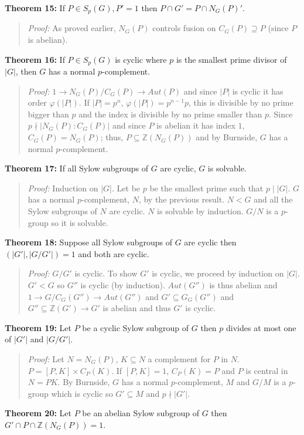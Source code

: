 {\bf Theorem 15:}
If $P \in S_p (G), P'=1$ then $P \cap G' = P \cap N_G(P)'$.
\begin{quote}
\emph{Proof:}  
As proved earlier, $N_G(P)$ controls fusion on $C_G(P) \supseteq P$ (since $P$ is abelian).
\end{quote}
{\bf Theorem 16:} If $P \in S_p(G)$ is cyclic where $p$ is the smallest prime divisor of $|G|$,
then $G$ has a normal $p$-complement.
\begin{quote}
\emph{Proof:}  
$1 \rightarrow N_G(P)/C_G(P) \rightarrow Aut(P)$ and since $|P|$ is cyclic it has order
$\varphi(|P|)$.  If $|P|= p^n$, $\varphi(|P|)= p^{n-1}p$, this is divisible by no prime
bigger than $p$ and the index is divisible by no prime smaller than $p$.  
Since $p \nmid |N_G(P):C_G(P)|$ and since $P$ is abelian it has index $1$, $C_G(P)= N_G(P)$;
thus, $P \subseteq  {\mathbb Z}(N_G(P))$ and by Burnside, $G$ has a normal $p$-complement.
\end{quote}
{\bf Theorem 17:}
If all Sylow subgroups of $G$ are cyclic, $G$ is solvable.  
\begin{quote}
\emph{Proof:}  
Induction on $|G|$.  Let be $p$ be the smallest prime such that $p \mid |G|$.
$G$ has a normal $p$-complement, $N$, by the previous result.  $N < G$ and all the
Sylow subgroups of $N$ are cyclic.  $N$ is solvable by induction. $G/N$ is a $p$-group
so it is solvable.
\end{quote}
{\bf Theorem 18:}
Suppose all Sylow subgroups of $G$ are cyclic then $(|G'|, |G/G'|)=1$ and both are cyclic.
\begin{quote}
\emph{Proof:}  
$G/G'$ is cyclic.  To show $G'$ is cyclic, we proceed by induction on $|G|$.
$G' < G$ so $G''$ is cyclic (by induction).  $Aut(G'')$ is thus abelian and
$1 \rightarrow G/C_G(G'') \rightarrow Aut(G'')$ and $G' \subseteq G_G(G'')$ and
$G'' \subseteq {\mathbb Z}(G') \rightarrow G'$ is abelian and thus $G'$ is cyclic.
\end{quote}
{\bf Theorem 19:}
Let $P$ be a cyclic Sylow subgroup of $G$ then $p$ divides at most one of $|G'|$ and $|G/G'|$.
\begin{quote}
\emph{Proof:}  
Let $N=N_G(P)$, $K \subseteq N$ a complement for $P$ in $N$.  $P= [P,K] \times C_P(K)$.
If $[P, K]=1$, $C_P(K)=P$ and $P$ is central in $N=PK$.  By Burnside,
$G$ has a normal $p$-complement, $M$ and $G/M$ is a $p$-group which is cyclic so
$G' \subseteq M$ and $p \nmid |G'|$.
\end{quote}
{\bf Theorem 20:}
Let $P$ be an abelian Sylow subgroup of $G$ then $G' \cap P \cap {\mathbb Z}(N_G(P))=1$.

